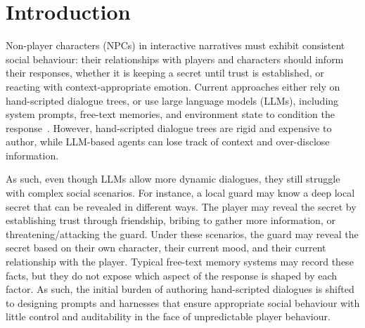 \documentclass[11pt]{article}
\begin{document}
\section{Introduction}
\label{sec:intro}

Non-player characters (NPCs) in interactive narratives must exhibit consistent social behaviour: their relationships with players and characters should inform their responses, whether it is keeping a secret until trust is established, or reacting with context-appropriate emotion.
Current approaches either rely on hand-scripted dialogue trees, or use large language models (LLMs), including system prompts, free-text memories, and environment state to condition the response~\cite{park2023generative,wang2023voyager}. However, hand-scripted dialogue trees are rigid and expensive to author, while LLM-based agents can lose track of context and over-disclose information.

As such, even though LLMs allow more dynamic dialogues, they still struggle with complex social scenarios. For instance, a local guard may know a deep local secret that can be revealed in different ways. The player may reveal the secret by establishing trust through friendship, bribing to gather more information, or threatening/attacking the guard. Under these scenarios, the guard may reveal the secret based on their own character, their current mood, and their current relationship with the player. Typical free-text memory systems may record these facts, but they do not expose which aspect of the response is shaped by each factor. As such, the initial burden of authoring hand-scripted dialogues is shifted to designing prompts and harnesses that ensure appropriate social behaviour with little control and auditability in the face of unpredictable player behaviour.
\end{document}
